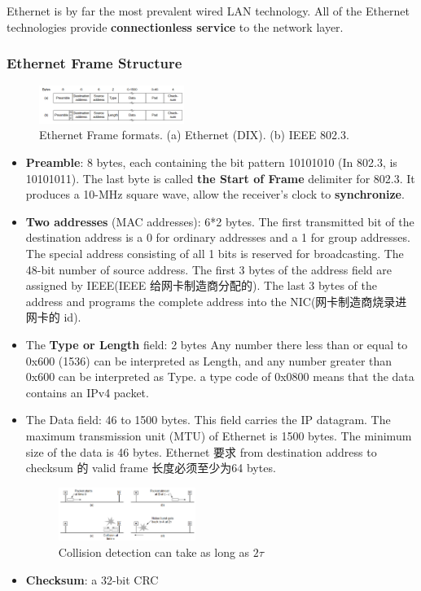Ethernet is by far the most prevalent wired LAN technology. All of the Ethernet technologies provide \textbf{connectionless service} to the network layer.

\subsubsection{Ethernet Frame Structure}
\begin{figure}[!htb]
    \centering
    \includegraphics[width=0.42\textwidth]{pic/CN4/Frame formats}
    \caption{Ethernet Frame formats. (a) Ethernet (DIX). (b) IEEE 802.3.}
\end{figure}
\begin{itemize}
    \item \textbf{Preamble}: 8 bytes, each containing the bit pattern
    10101010 (In 802.3, is 10101011). The last byte is called \textbf{the Start of Frame} delimiter for 802.3. It produces a 10-MHz square
    wave, allow the receiver's clock to \textbf{synchronize}. 
    \item \textbf{Two addresses} (MAC addresses): 6*2 bytes. 
    \subitem The first transmitted bit of the destination address is a 0 for ordinary addresses and a 1 for group addresses. 
    \subitem The special address consisting of all 1 bits is reserved for broadcasting. 
    \subitem The 48-bit number of source address. The first 3 bytes of the address field are assigned by IEEE(IEEE 给网卡制造商分配的). The last 3 bytes of the address and programs the complete address into the NIC(网卡制造商烧录进网卡的 id).
    \item The \textbf{Type or Length} field: 2 bytes
    \subitem Any number there less than or equal to 0x600 (1536) can be interpreted as Length, and any number greater than 0x600 can be
    interpreted as Type. 
    \subitem a type code of 0x0800 means that the data contains an IPv4 packet.
    \item The Data field: 46 to 1500 bytes. 
    \subitem This field carries the IP datagram. The maximum transmission unit (MTU) of Ethernet is 1500 bytes. 
    \subitem The minimum size of the data is 46 bytes. Ethernet 要求 from destination address to checksum 的 valid frame 长度必须至少为64 bytes. 
    \begin{figure}[!htb]
        \centering
        \includegraphics[width=0.42\textwidth]{pic/CN4/Collision detection}
        \caption{Collision detection can take as long as $2\tau$}
    \end{figure}
    \item \textbf{Checksum}: a 32-bit CRC
\end{itemize}

